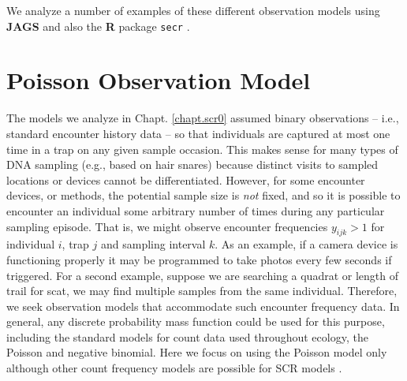 We analyze a number of examples of these different observation models
using {\bf JAGS} and also the {\bf R}
package \mbox{\tt secr} \citep{efford:2011}.




\section{Poisson Observation Model}
\label{poisson-mn.sec.poisson}

The models we analyze in Chapt. \ref{chapt.scr0} assumed binary
observations -- i.e., standard encounter history data -- so
that individuals are captured at most one time in a trap on any given
sample occasion.  This makes
sense for many types of DNA sampling (e.g., based on hair snares)
because distinct visits to sampled locations or devices cannot be
differentiated. However, for some encounter devices, or methods, the
potential sample size is {\it not} fixed, and so it is
possible to encounter an individual some arbitrary number of times
during any particular sampling episode.
That is, we might observe
encounter frequencies $y_{ijk}>1$
for individual $i$, trap $j$ and
sampling interval $k$.  As an example, if a camera device is
functioning properly it may be programmed to take photos every few
seconds if triggered.  For a second example, suppose we are searching
a quadrat or length of trail for scat, we may find multiple samples from the same
individual.
Therefore, we seek observation models that accommodate such encounter
frequency data.  In general, any discrete probability mass function
could be used for this purpose, including the standard models for
count data used throughout ecology, the Poisson and negative
binomial.  Here we focus on using the Poisson
model only although other count frequency models are possible for SCR models
\citep{efford_etal:2009ecol}.

